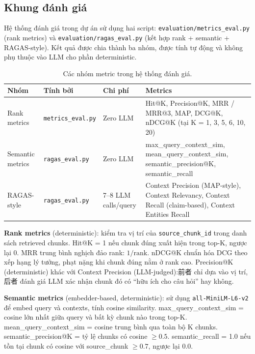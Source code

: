 \subsection{Khung đánh giá}
\label{sec:evaluation-framework}

Hệ thống đánh giá trong dự án sử dụng hai script: \texttt{evaluation/metrics\_eval.py} (rank metrics) và \texttt{evaluation/ragas\_eval.py} (kết hợp rank + semantic + RAGAS-style). Kết quả được chia thành ba nhóm, được tính tự động và không phụ thuộc vào LLM cho phần deterministic.

\begin{table}[t]
\centering
\caption{Các nhóm metric trong hệ thống đánh giá.}
\label{tab:metrics-overview}
\small
\begin{tabular}{l l l p{}}
\hline
\textbf{Nhóm} & \textbf{Tính bởi} & \textbf{Chi phí} & \textbf{Metrics} \\ \hline
Rank metrics & \texttt{metrics\_eval.py} & Zero LLM & Hit@K, Precision@K, MRR / MRR@3, MAP, DCG@K, nDCG@K (tại K = 1, 3, 5, 6, 10, 20) \\
Semantic metrics & \texttt{ragas\_eval.py} & Zero LLM & max\_query\_context\_sim, mean\_query\_context\_sim, semantic\_precision@K, semantic\_recall \\
RAGAS-style & \texttt{ragas\_eval.py} & 7--8 LLM calls/query & Context Precision (MAP-style), Context Relevancy, Context Recall (claim-based), Context Entities Recall \\
\hline
\end{tabular}
\end{table}

\textbf{Rank metrics} (deterministic): kiểm tra vị trí của \texttt{source\_chunk\_id} trong danh sách retrieved chunks. Hit@K = 1 nếu chunk đúng xuất hiện trong top-K, ngược lại 0. MRR trung bình nghịch đảo rank: $1 / \text{rank}$. nDCG@K chuẩn hóa DCG theo xếp hạng lý tưởng, phạt nặng khi chunk đúng nằm ở rank cao. Precision@K (deterministic) khác với Context Precision (LLM-judged):前者 chỉ dựa vào vị trí,后者 đánh giá LLM xác nhận chunk đó có ``hữu ích cho câu hỏi'' hay không.

\textbf{Semantic metrics} (embedder-based, deterministic): sử dụng \texttt{all-MiniLM-L6-v2} để embed query và contexts, tính cosine similarity. max\_query\_context\_sim = cosine lớn nhất giữa query và bất kỳ chunk nào trong top-K. mean\_query\_context\_sim = cosine trung bình qua toàn bộ K chunks. semantic\_precision@K = tỷ lệ chunks có cosine $\geq 0.5$. semantic\_recall = 1.0 nếu tồn tại chunk có cosine với source\_chunk $\geq 0.7$, ngược lại 0.0.

